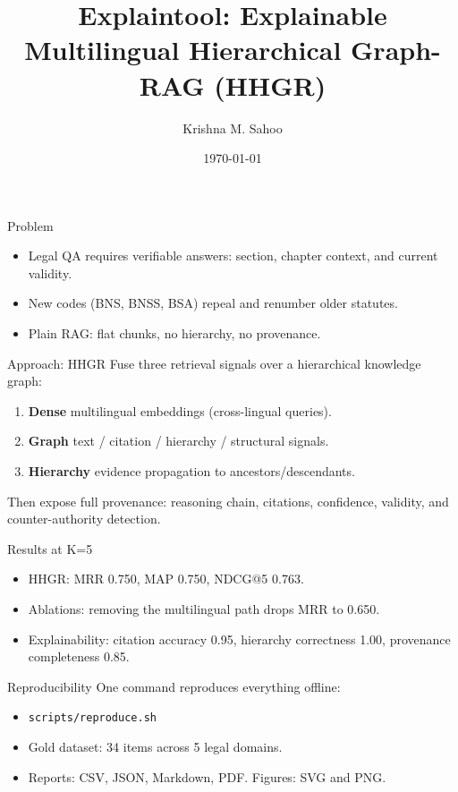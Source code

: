 \documentclass[10pt]{beamer}
\title{Explaintool: Explainable Multilingual Hierarchical Graph-RAG (HHGR)}
\author{Krishna M. Sahoo}
\date{\today}
\begin{document}
\begin{frame}
  \titlepage
\end{frame}

\begin{frame}{Problem}
  \begin{itemize}
    \item Legal QA requires verifiable answers: section, chapter context, and
          current validity.
    \item New codes (BNS, BNSS, BSA) repeal and renumber older statutes.
    \item Plain RAG: flat chunks, no hierarchy, no provenance.
  \end{itemize}
\end{frame}

\begin{frame}{Approach: HHGR}
  Fuse three retrieval signals over a hierarchical knowledge graph:
  \begin{enumerate}
    \item \textbf{Dense} multilingual embeddings (cross-lingual queries).
    \item \textbf{Graph} text / citation / hierarchy / structural signals.
    \item \textbf{Hierarchy} evidence propagation to ancestors/descendants.
  \end{enumerate}
  Then expose full provenance: reasoning chain, citations, confidence,
  validity, and counter-authority detection.
\end{frame}

\begin{frame}{Results at K=5}
  \begin{itemize}
    \item HHGR: MRR 0.750, MAP 0.750, NDCG@5 0.763.
    \item Ablations: removing the multilingual path drops MRR to 0.650.
    \item Explainability: citation accuracy 0.95, hierarchy correctness 1.00,
          provenance completeness 0.85.
  \end{itemize}
\end{frame}

\begin{frame}{Reproducibility}
  One command reproduces everything offline:
  \begin{itemize}
    \item \texttt{scripts/reproduce.sh}
    \item Gold dataset: 34 items across 5 legal domains.
    \item Reports: CSV, JSON, Markdown, PDF. Figures: SVG and PNG.
  \end{itemize}
\end{frame}
\end{document}
